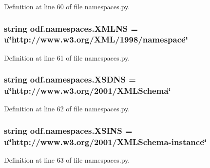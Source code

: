 Definition at line 60 of file namespaces.\+py.

\hypertarget{namespaceodf_1_1namespaces_aed440da8646f3c462c833fc283ccb23c}{
\subsubsection[{X\+M\+L\+N\+S}]{\setlength{\rightskip}{0pt plus 5cm}string odf.\+namespaces.\+X\+M\+L\+N\+S = u\char`\"{}http\+://www.\+w3.\+org/X\+M\+L/1998/namespace\char`\"{}}}\label{namespaceodf_1_1namespaces_aed440da8646f3c462c833fc283ccb23c}


Definition at line 61 of file namespaces.\+py.

\hypertarget{namespaceodf_1_1namespaces_ae0a786c0d6f5f8398bab5b18c062512d}{
\subsubsection[{X\+S\+D\+N\+S}]{\setlength{\rightskip}{0pt plus 5cm}string odf.\+namespaces.\+X\+S\+D\+N\+S = u\char`\"{}http\+://www.\+w3.\+org/2001/X\+M\+L\+Schema\char`\"{}}}\label{namespaceodf_1_1namespaces_ae0a786c0d6f5f8398bab5b18c062512d}


Definition at line 62 of file namespaces.\+py.

\hypertarget{namespaceodf_1_1namespaces_a46a3a0e49cc347678af5fb8d994652ce}{
\subsubsection[{X\+S\+I\+N\+S}]{\setlength{\rightskip}{0pt plus 5cm}string odf.\+namespaces.\+X\+S\+I\+N\+S = u\char`\"{}http\+://www.\+w3.\+org/2001/X\+M\+L\+Schema-\/instance\char`\"{}}}\label{namespaceodf_1_1namespaces_a46a3a0e49cc347678af5fb8d994652ce}


Definition at line 63 of file namespaces.\+py.

